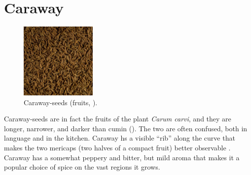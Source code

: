 
\section{Caraway}
\label{sec:caraway}




\begin{figure}
	\vspace{-\baselineskip}
	\includegraphics[width=0.33\textwidth]{imgs/spices/caraway-1.jpg}
	\caption{Caraway-seeds (fruits, ).}
	\label{fig:caraway}
\end{figure}

Caraway-seeds are in fact the fruits of the plant \textit{Carum carvi}, and they are longer, narrower, and darker than cumin (). The two are often confused, both in language and in the kitchen. Caraway hs a visible ``rib'' along the curve that makes the two mericaps (two halves of a compact fruit) better observable \autocite[100]{van_wyk_culinary_2014}. Caraway has a somewhat peppery and bitter, but mild aroma that makes it a popular choice of spice on the vast regions it grows.



